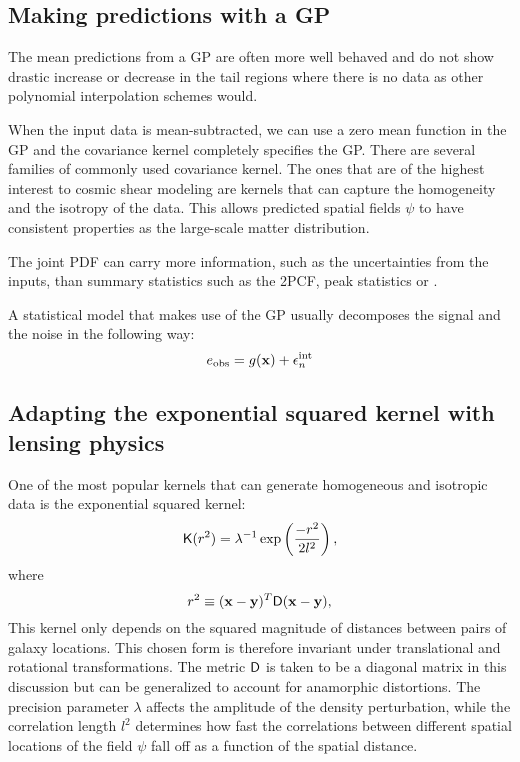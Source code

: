 \subsection{Making predictions with a GP}
The mean predictions from a GP are
often more well behaved and do not show drastic increase or decrease 
in the tail regions where there is no data as other polynomial interpolation schemes 
would.  





When the input data is mean-subtracted, we can use a zero mean function in the
GP and the covariance kernel completely specifies the GP. 
There are several families of commonly used covariance kernel.
The ones that are of the highest interest to cosmic shear modeling 
are kernels that can capture 
the homogeneity and the isotropy of the data. This allows predicted spatial fields
$\psi$ to have consistent properties as the large-scale matter distribution.

The joint PDF can carry more information,
such as the uncertainties from the inputs, 
than summary statistics such as the 2PCF, peak statistics or .

A statistical model that makes use of the GP usually decomposes 
the signal and the noise in the following way: 
\begin{equation}
	e_{\rm obs} = g(\mathbf{x}) + \epsilon_n^{\rm int}  
\end{equation}



\subsection{Adapting the exponential squared kernel with lensing physics}
One of the most popular kernels that can generate homogeneous and
isotropic data is the exponential squared kernel: 
\begin{equation}
	\mathsf{K}(r^2) = \lambda^{-1} \exp\left(\frac{-r^2}{2 l^2}\right),
	\label{eq:exp_sq_kernel}
\end{equation}
where 
\begin{equation}
	r^2 \equiv (\mathbf{x} - \mathbf{y})^T \mathsf{D} (\mathbf{x} - \mathbf{y}), 
\end{equation}
This kernel only depends on the
squared magnitude of distances between pairs of galaxy locations. 
This chosen form is therefore invariant
under translational and rotational transformations.
The metric $\mathsf{D}$ is taken to be a diagonal matrix in this discussion but  
can be generalized to account for anamorphic distortions. 
The precision parameter $\lambda$ affects the 
amplitude of the density perturbation, while the correlation length $l^2$ 
determines how fast the correlations between different spatial locations of the
field $\psi$ fall off as a function of the spatial distance.

